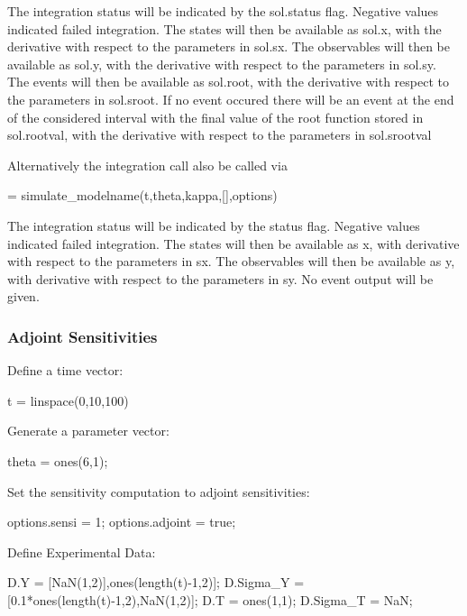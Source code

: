 The integration status will be indicated by the sol.\+status flag. Negative values indicated failed integration. The states will then be available as sol.\+x, with the derivative with respect to the parameters in sol.\+sx. The observables will then be available as sol.\+y, with the derivative with respect to the parameters in sol.\+sy. The events will then be available as sol.\+root, with the derivative with respect to the parameters in sol.\+sroot. If no event occured there will be an event at the end of the considered interval with the final value of the root function stored in sol.\+rootval, with the derivative with respect to the parameters in sol.\+srootval

Alternatively the integration call also be called via


\begin{DoxyCode}
[status,t,x,y,sx,sy] = simulate\_modelname(t,theta,kappa,[],options)
\end{DoxyCode}


The integration status will be indicated by the status flag. Negative values indicated failed integration. The states will then be available as x, with derivative with respect to the parameters in sx. The observables will then be available as y, with derivative with respect to the parameters in sy. No event output will be given.\hypertarget{def_simu_adjoint}{}\subsubsection{Adjoint Sensitivities}\label{def_simu_adjoint}
Define a time vector\+:


\begin{DoxyCode}
t = linspace(0,10,100)
\end{DoxyCode}


Generate a parameter vector\+:


\begin{DoxyCode}
theta = ones(6,1);
\end{DoxyCode}


Set the sensitivity computation to adjoint sensitivities\+:


\begin{DoxyCode}
options.sensi = 1;
options.adjoint = \textcolor{keyword}{true};
\end{DoxyCode}


Define Experimental Data\+:


\begin{DoxyCode}
D.Y = [NaN(1,2)],ones(length(t)-1,2)];
D.Sigma\_Y = [0.1*ones(length(t)-1,2),NaN(1,2)];
D.T = ones(1,1);
D.Sigma\_T = NaN;
\end{DoxyCode}


